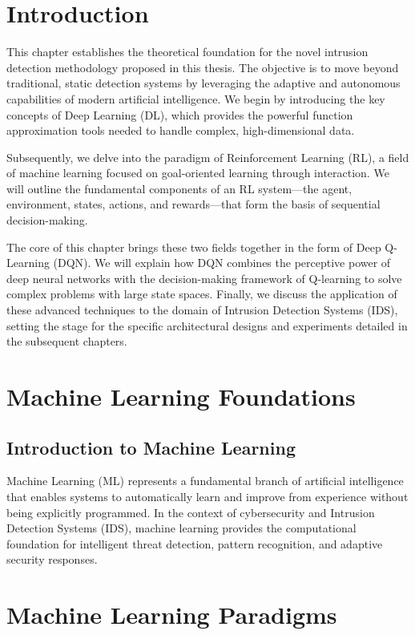 \documentclass[16pt]{report}
\begin{document}
\section{Introduction}
This chapter establishes the theoretical foundation for the novel intrusion detection methodology proposed in this thesis. The objective is to move beyond traditional, static detection systems by leveraging the adaptive and autonomous capabilities of modern artificial intelligence. We begin by introducing the key concepts of Deep Learning (DL), which provides the powerful function approximation tools needed to handle complex, high-dimensional data.

Subsequently, we delve into the paradigm of Reinforcement Learning (RL), a field of machine learning focused on goal-oriented learning through interaction. We will outline the fundamental components of an RL system—the agent, environment, states, actions, and rewards—that form the basis of sequential decision-making.

The core of this chapter brings these two fields together in the form of Deep Q-Learning (DQN). We will explain how DQN combines the perceptive power of deep neural networks with the decision-making framework of Q-learning to solve complex problems with large state spaces. Finally, we discuss the application of these advanced techniques to the domain of Intrusion Detection Systems (IDS), setting the stage for the specific architectural designs and experiments detailed in the subsequent chapters.
\section{Machine Learning Foundations} 

\subsection{Introduction to Machine Learning}

Machine Learning (ML) represents a fundamental branch of artificial intelligence that enables systems to automatically learn and improve from experience without being explicitly programmed. In the context of cybersecurity and Intrusion Detection Systems (IDS), machine learning provides the computational foundation for intelligent threat detection, pattern recognition, and adaptive security responses.

\section{Machine Learning Paradigms}
\end{document}
